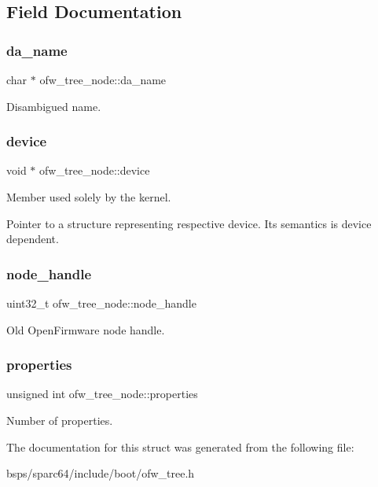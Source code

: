 \subsection{Field Documentation}
\mbox{\label{structofw__tree__node_a73668a73c5c382a7fb0b35ecdeae0c36}} 
\subsubsection{\texorpdfstring{da\_name}{da\_name}}
{\footnotesize\ttfamily char $\ast$ ofw\+\_\+tree\+\_\+node\+::da\+\_\+name}

Disambigued name. \mbox{\label{structofw__tree__node_ac3e2890623aeb074f9391d4a4677e44e}} 
\subsubsection{\texorpdfstring{device}{device}}
{\footnotesize\ttfamily void $\ast$ ofw\+\_\+tree\+\_\+node\+::device}

Member used solely by the kernel.

Pointer to a structure representing respective device. Its semantics is device dependent. \mbox{\label{structofw__tree__node_a391eaf3e7335a6329ca81fcd77c050be}} 
\subsubsection{\texorpdfstring{node\_handle}{node\_handle}}
{\footnotesize\ttfamily uint32\+\_\+t ofw\+\_\+tree\+\_\+node\+::node\+\_\+handle}

Old Open\+Firmware node handle. \mbox{\label{structofw__tree__node_aa508923747451d53edb621f6660b4e68}} 
\subsubsection{\texorpdfstring{properties}{properties}}
{\footnotesize\ttfamily unsigned int ofw\+\_\+tree\+\_\+node\+::properties}

Number of properties. 

The documentation for this struct was generated from the following file\+:\begin{DoxyCompactItemize}
\item 
bsps/sparc64/include/boot/ofw\+\_\+tree.\+h\end{DoxyCompactItemize}
